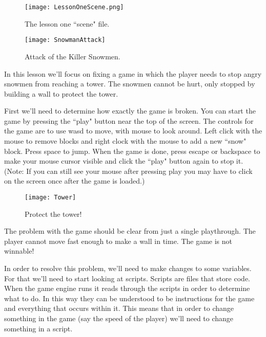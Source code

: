 \documentclass{article}
\begin{document}
\begin{figure}
  \texttt{[image: LessonOneScene.png]}
  \caption{The lesson one ``scene" file.}
  \label{fig:scene1}
\end{figure}

\begin{figure}
  \texttt{[image: SnowmanAttack]}
  \caption{Attack of the Killer Snowmen.}
  \label{fig:scene2}
\end{figure}

In this lesson we'll focus on fixing a game in which the player needs to stop angry snowmen from reaching a tower. The snowmen cannot be hurt, only stopped by building a wall to protect the tower.

First we'll need to determine how exactly the game is broken. You can start the game by pressing the ``play" button near the top of the screen. The controls for the game are to use wasd to move, with mouse to look around. Left click with the mouse to remove blocks and right clock with the mouse to add a new ``snow" block. Press space to jump. When the game is done, press escape or backspace to make your mouse cursor visible and click the ``play" button again to stop it. (Note: If you can still see your mouse after pressing play you may have to click on the screen once after the game is loaded.)

\begin{figure}
  \texttt{[image: Tower]}
  \caption{Protect the tower!}
  \label{fig:tower}
\end{figure}

\noindent{}

The problem with the game should be clear from just a single playthrough. The player cannot  move fast enough to make a wall in time. The game is not winnable!

In order to resolve this problem, we'll need to make changes to some variables. For that we'll need to start looking at scripts. Scripts are files that store code. When the game engine runs it reads through the scripts in order to determine what to do. In this way they can be understood to be instructions for the game and everything that occurs within it. This means that in order to change something in the game (say the speed of the player) we'll need to change something in a script. 
\end{document}
